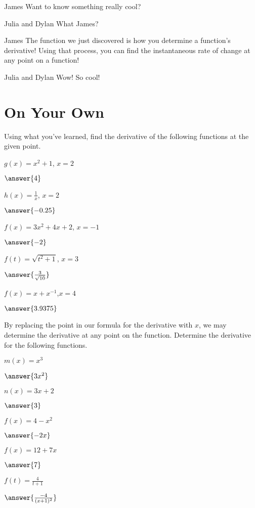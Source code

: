 \documentclass{ximera}
\begin{document}
\begin{dialogue}
\item[James] Want to know something really cool?
\item[Julia and Dylan] What James?
\item[James] The function we just discovered is how you determine a function's derivative! Using that process, you can find the instantaneous rate of change at any point on a function!
\item[Julia and Dylan] Wow! So cool!
\end{dialogue}

\section{On Your Own}
Using what you've learned, find the derivative of the following functions at the given point.
\setcounter{problem}{0}
\begin{question}
$g(x) = x^2+1$, $x=2$

$\answer{4}$

$h(x) = \frac{1}{x}$, $x=2$

$\answer{-0.25}$

$f(x)=3x^2+4x+2$, $x=-1$

$\answer{-2}$

$f(t)=\sqrt{t^2+1}$, $x=3$

$\answer{\frac{3}{\sqrt{10}}}$

$f(x) = x+x^{-1}$,$x=4$

$\answer{3.9375}$

\end{question}

By replacing the point in our formula for the derivative with $x$, we may determine the derivative at any point on the function. Determine the derivative for the following functions.
\begin{question}
$m(x) = x^3$

$\answer{3x^2}$

$n(x) = 3x+2$

$\answer{3}$

$f(x)=4-x^2$

$\answer{-2x}$

$f(x) = 12+7x$

$\answer{7}$

$f(t)=\frac{4}{t+1}$

$\answer{\frac{-4}{(x+1)^2}}$

\end{question}
\end{document}
